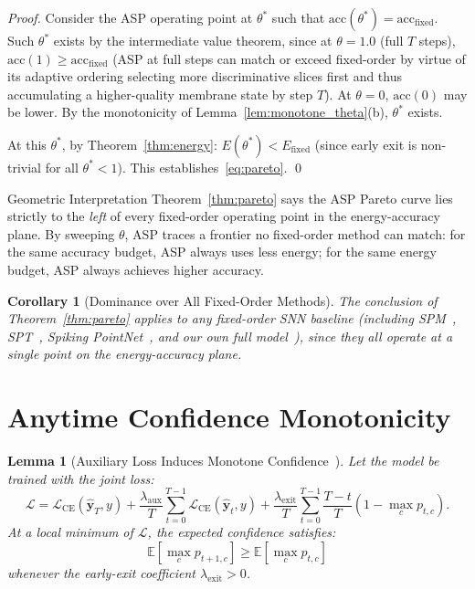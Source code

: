 \documentclass[11pt,a4paper]{article}
\newtheorem{lemma}[theorem]{Lemma}
\newtheorem{corollary}[theorem]{Corollary}
\newcommand{\by}{\mathbf{y}}
\newcommand{\cL}{\mathcal{L}}
\newcommand{\EE}{\mathbb{E}}
\begin{document}
\begin{proof}
Consider the ASP operating point at $\theta^*$ such that
$\mathrm{acc}(\theta^*) = \mathrm{acc}_\mathrm{fixed}$.  Such $\theta^*$ exists
by the intermediate value theorem, since at $\theta = 1.0$ (full $T$ steps),
$\mathrm{acc}(1) \geq \mathrm{acc}_\mathrm{fixed}$ (ASP at full steps can
match or exceed fixed-order by virtue of its adaptive ordering selecting
more discriminative slices first and thus accumulating a higher-quality
membrane state by step $T$).  At $\theta = 0$, $\mathrm{acc}(0)$ may be lower.
By the monotonicity of Lemma~\ref{lem:monotone_theta}(b), $\theta^*$ exists.

At this $\theta^*$, by Theorem~\ref{thm:energy}:
$E(\theta^*) < E_\mathrm{fixed}$ (since early exit is non-trivial for all
$\theta^* < 1$).  This establishes~\eqref{eq:pareto}.  \qed
\end{proof}

\begin{insightbox}{Geometric Interpretation}
Theorem~\ref{thm:pareto} says the ASP Pareto curve lies strictly to the \emph{left}
of every fixed-order operating point in the energy-accuracy plane.  By sweeping
$\theta$, ASP traces a frontier no fixed-order method can match: for the same
accuracy budget, ASP always uses less energy; for the same energy budget, ASP
always achieves higher accuracy.
\end{insightbox}

\begin{corollary}[Dominance over All Fixed-Order Methods]
\label{cor:dominates_all}
The conclusion of Theorem~\ref{thm:pareto} applies to any fixed-order SNN
baseline (including SPM~\cite{spm2025}, SPT~\cite{spt}, Spiking PointNet~\cite{spiking_ptnet},
and our own full model~\cite{purdue2026}),
since they all operate at a single point on the energy-accuracy plane.
\end{corollary}

\section{Anytime Confidence Monotonicity}

\begin{lemma}[Auxiliary Loss Induces Monotone Confidence~{\cite{teerapittayanon2016,huang2018,graves2016}}]
\label{lem:monotone_conf}
Let the model be trained with the joint loss:
\[
  \cL = \cL_\mathrm{CE}(\hat{\by}_T, y)
      + \frac{\lambda_\mathrm{aux}}{T} \sum_{t=0}^{T-1} \cL_\mathrm{CE}(\hat{\by}_t, y)
      + \frac{\lambda_\mathrm{exit}}{T} \sum_{t=0}^{T-1} \frac{T-t}{T}(1 - \max_c p_{t,c}).
\]
At a local minimum of $\cL$, the expected confidence satisfies:
\begin{equation}
  \EE[\max_c p_{t+1,c}] \geq \EE[\max_c p_{t,c}]
  \label{eq:mono_conf}
\end{equation}
whenever the early-exit coefficient $\lambda_\mathrm{exit} > 0$.
\end{lemma}
\end{document}
